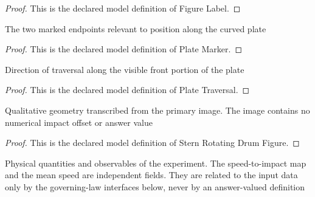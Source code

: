 \begin{proof}
  This is the declared model definition of Figure Label.
\end{proof}
\begin{definition}
  \label{def:physics:phyx-mini-0564:phyxminiproblems-problemphyxmini0564-platemarker}
  The two marked endpoints relevant to position along the curved plate
\end{definition}
\begin{proof}
  This is the declared model definition of Plate Marker.
\end{proof}
\begin{definition}
  \label{def:physics:phyx-mini-0564:phyxminiproblems-problemphyxmini0564-platetraversal}
  Direction of traversal along the visible front portion of the plate
\end{definition}
\begin{proof}
  This is the declared model definition of Plate Traversal.
\end{proof}
\begin{definition}
  \label{def:physics:phyx-mini-0564:phyxminiproblems-problemphyxmini0564-sternrotatingdrumfigure}
  Qualitative geometry transcribed from the primary image. The image contains no numerical impact offset or answer value
\end{definition}
\begin{proof}
  This is the declared model definition of Stern Rotating Drum Figure.
\end{proof}
\begin{definition}
  \label{def:physics:phyx-mini-0564:phyxminiproblems-problemphyxmini0564-sternspeeddistributionsetup}
  Physical quantities and observables of the experiment. The speed-to-impact map and the mean speed are independent fields. They are related to the input data only by the governing-law interfaces below, never by an answer-valued definition
\end{definition}
